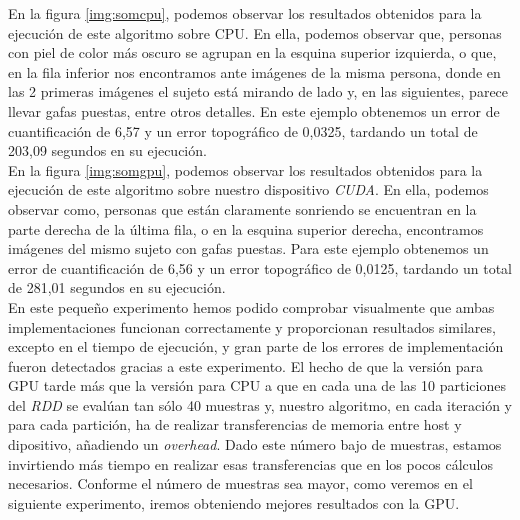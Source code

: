 En la figura \ref{img:somcpu}, podemos observar los resultados obtenidos para la ejecución de este algoritmo sobre CPU. En ella, podemos observar que, personas con piel de color más oscuro se agrupan en la esquina superior izquierda, o que, en la fila inferior nos encontramos ante imágenes de la misma persona, donde en las 2 primeras imágenes el sujeto está mirando de lado y, en las siguientes, parece llevar gafas puestas, entre otros detalles. En este ejemplo obtenemos un error de cuantificación de 6,57 y un error topográfico de 0,0325, tardando un total de 203,09 segundos en su ejecución.\\

En la figura \ref{img:somgpu}, podemos observar los resultados obtenidos para la ejecución de este algoritmo sobre nuestro dispositivo \textit{CUDA}. En ella, podemos observar como, personas que están claramente sonriendo se encuentran en la parte derecha de la última fila, o en la esquina superior derecha, encontramos imágenes del mismo sujeto con gafas puestas. Para este ejemplo obtenemos un error de cuantificación de 6,56 y un error topográfico de 0,0125, tardando un total de 281,01 segundos en su ejecución.\\
	
En este pequeño experimento hemos podido comprobar visualmente que ambas implementaciones funcionan correctamente y proporcionan resultados similares, excepto en el tiempo de ejecución, y gran parte de los errores de implementación fueron detectados gracias a este experimento. El hecho de que la versión para GPU tarde más que la versión para CPU a que en cada una de las 10 particiones del \textit{RDD} se evalúan tan sólo 40 muestras y, nuestro algoritmo, en cada iteración y para cada partición, ha de realizar transferencias de memoria entre host y dipositivo, añadiendo un \textit{overhead}. Dado este número bajo de muestras, estamos invirtiendo más tiempo en realizar esas transferencias que en los pocos cálculos necesarios. Conforme el número de muestras sea mayor, como veremos en el siguiente experimento, iremos obteniendo mejores resultados con la GPU.\\

